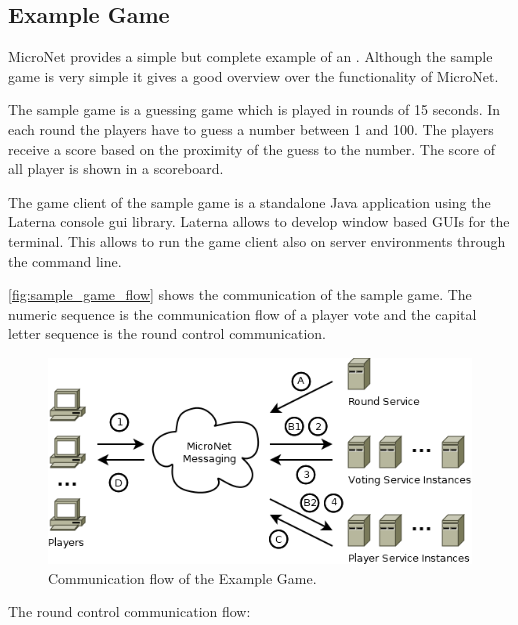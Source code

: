 \subsection{Example Game}
\label{sub:example_game}

MicroNet provides a simple but complete example of an \og{}. Although the sample
game is very simple it gives a good overview over the functionality of MicroNet.

The sample game is a guessing game which is played in rounds of 15 seconds.
In each round the players have to guess a number between 1 and 100. The players
receive a score based on the proximity of the guess to the number. The score of
all player is shown in a scoreboard. 

The game client of the sample game is a standalone Java application using the
Laterna console gui library. Laterna allows to develop window based GUIs for the
terminal. This allows to run the game client also on server environments
through the command line. 

\autoref{fig:sample_game_flow} shows the communication of the sample game. The
numeric sequence is the communication flow of a player vote and the capital
letter sequence is the round control communication.\\

\begin{figure}
	\centering
	\includegraphics[width=\textwidth]{images/architecture/SampleGame}
	\caption{Communication flow of the Example Game.}
	\label{fig:sample_game_flow}
\end{figure}

The round control communication flow:

